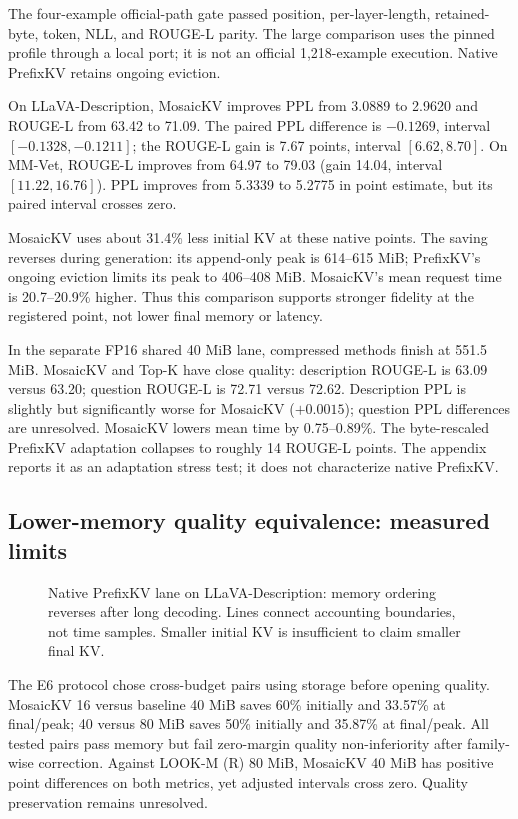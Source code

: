 The four-example official-path gate passed position, per-layer-length,
retained-byte, token, NLL, and ROUGE-L parity. The large comparison uses the
pinned profile through a local port; it is not an official 1,218-example
execution. Native PrefixKV retains ongoing eviction.

On LLaVA-Description, MosaicKV improves PPL from 3.0889 to 2.9620 and
ROUGE-L from 63.42 to 71.09. The paired PPL difference is $-0.1269$,
interval $[-0.1328,-0.1211]$; the ROUGE-L gain is 7.67 points,
interval $[6.62,8.70]$. On MM-Vet, ROUGE-L improves from 64.97 to 79.03
(gain 14.04, interval $[11.22,16.76]$). PPL improves from 5.3339 to
5.2775 in point estimate, but its paired interval crosses zero.

MosaicKV uses about 31.4\% less initial KV at these native points.
The saving reverses during generation: its append-only peak is
614--615 MiB; PrefixKV's ongoing eviction limits its peak to 406--408 MiB.
MosaicKV's mean request time is 20.7--20.9\% higher. Thus this comparison
supports stronger fidelity at the registered point, not lower final memory
or latency.

In the separate FP16 shared 40 MiB lane, compressed methods finish at
551.5 MiB. MosaicKV and Top-K have close quality: description ROUGE-L is
63.09 versus 63.20; question ROUGE-L is 72.71 versus 72.62.
Description PPL is slightly but significantly worse for MosaicKV
($+0.0015$); question PPL differences are unresolved.
MosaicKV lowers mean time by 0.75--0.89\%.
The byte-rescaled PrefixKV adaptation collapses to roughly 14 ROUGE-L points.
The appendix reports it as an adaptation stress test; it does not characterize
native PrefixKV.

\subsection{Lower-memory quality equivalence: measured limits}
\begin{figure}[t]
\centering
\caption{Native PrefixKV lane on LLaVA-Description: memory ordering reverses
after long decoding. Lines connect accounting boundaries, not time samples.
Smaller initial KV is insufficient to claim smaller final KV.}
\label{fig:boundaries}
\end{figure}

The E6 protocol chose cross-budget pairs using storage before opening quality.
MosaicKV 16 versus baseline 40 MiB saves 60\% initially and 33.57\%
at final/peak; 40 versus 80 MiB saves 50\% initially and 35.87\%
at final/peak. All tested pairs pass memory but fail zero-margin quality
non-inferiority after family-wise correction. Against LOOK-M (R) 80 MiB,
MosaicKV 40 MiB has positive point differences on both metrics, yet adjusted
intervals cross zero. Quality preservation remains unresolved.

